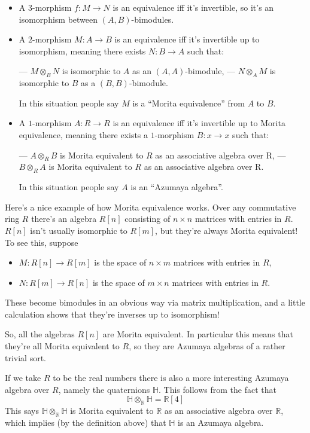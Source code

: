 \documentclass{article}
\begin{document}
\begin{itemize}
\item
  A \(3\)-morphism \(f\colon M \to N\) is an equivalence iff it's
  invertible, so it's an isomorphism between \((A,B)\)-bimodules.
\item
  A \(2\)-morphism \(M\colon A \to B\) is an equivalence iff it's
  invertible up to isomorphism, meaning there exists \(N\colon B \to A\)
  such that:

  --- \(M \otimes_B N\) is isomorphic to \(A\) as an \((A,A)\)-bimodule,
  --- \(N \otimes_A M\) is isomorphic to \(B\) as a \((B,B)\)-bimodule.

  In this situation people say \(M\) is a ``Morita equivalence'' from
  \(A\) to \(B\).
\item
  A \(1\)-morphism \(A\colon R \to R\) is an equivalence iff it's
  invertible up to Morita equivalence, meaning there exists a
  \(1\)-morphism \(B\colon x \to x\) such that:

  --- \(A \otimes_R B\) is Morita equivalent to \(R\) as an associative
  algebra over R, --- \(B \otimes_R A\) is Morita equivalent to \(R\) as
  an associative algebra over R.

  In this situation people say \(A\) is an ``Azumaya algebra''.
\end{itemize}

Here's a nice example of how Morita equivalence works. Over any
commutative ring \(R\) there's an algebra \(R[n]\) consisting of
\(n\times n\) matrices with entries in \(R\). \(R[n]\) isn't usually
isomorphic to \(R[m]\), but they're always Morita equivalent! To see
this, suppose

\begin{itemize}
\item
  \(M\colon R[n] \to R[m]\) is the space of \(n\times m\) matrices with
  entries in \(R\),
\item
  \(N\colon R[m] \to R[n]\) is the space of \(m\times n\) matrices with
  entries in \(R\).
\end{itemize}

These become bimodules in an obvious way via matrix multiplication, and
a little calculation shows that they're inverses up to isomorphism!

So, all the algebras \(R[n]\) are Morita equivalent. In particular this
means that they're all Morita equivalent to \(R\), so they are Azumaya
algebras of a rather trivial sort.

If we take \(R\) to be the real numbers there is also a more interesting
Azumaya algebra over \(R\), namely the quaternions \(\mathbb{H}\). This
follows from the fact that
\[\mathbb{H} \otimes_{\mathbb{R}} \mathbb{H} = \mathbb{R}[4]\] This says
\(\mathbb{H} \otimes_{\mathbb{R}} \mathbb{H}\) is Morita equivalent to
\(\mathbb{R}\) as an associative algebra over \(\mathbb{R}\), which
implies (by the definition above) that \(\mathbb{H}\) is an Azumaya
algebra.
\end{document}
